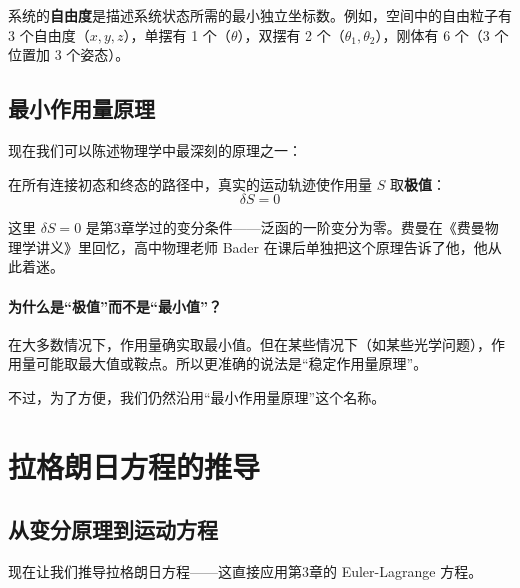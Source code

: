 \begin{definition}[自由度]
系统的\textbf{自由度}是描述系统状态所需的最小独立坐标数。例如，空间中的自由粒子有 3 个自由度（$x, y, z$），单摆有 1 个（$\theta$），双摆有 2 个（$\theta_1, \theta_2$），刚体有 6 个（3 个位置加 3 个姿态）。
\end{definition}

\subsection{最小作用量原理}

现在我们可以陈述物理学中最深刻的原理之一：

\begin{keytheorem}[title=最小作用量原理（Hamilton 原理）]
在所有连接初态和终态的路径中，真实的运动轨迹使作用量 $S$ 取\textbf{极值}：
\begin{equation}
\boxed{\delta S = 0}
\end{equation}
\end{keytheorem}

这里 $\delta S = 0$ 是第3章学过的变分条件——泛函的一阶变分为零。费曼在《费曼物理学讲义》里回忆，高中物理老师 Bader 在课后单独把这个原理告诉了他，他从此着迷。

\paragraph{为什么是“极值”而不是“最小值”？}

在大多数情况下，作用量确实取最小值。但在某些情况下（如某些光学问题），作用量可能取最大值或鞍点。所以更准确的说法是“稳定作用量原理”。

不过，为了方便，我们仍然沿用“最小作用量原理”这个名称。

\section{拉格朗日方程的推导}

\subsection{从变分原理到运动方程}

现在让我们推导拉格朗日方程——这直接应用第3章的 Euler-Lagrange 方程。

